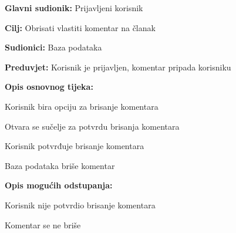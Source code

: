\noindent {}
\begin{packed_item}

\item \textbf{Glavni sudionik:} Prijavljeni korisnik
\item  \textbf{Cilj:} Obrisati vlastiti komentar na članak
\item  \textbf{Sudionici:} Baza podataka
\item  \textbf{Preduvjet:} Korisnik je prijavljen, komentar pripada korisniku
\item  \textbf{Opis osnovnog tijeka:}

\item[] \begin{packed_enum}

    \item Korisnik bira opciju za brisanje komentara
    \item Otvara se sučelje za potvrdu brisanja komentara
    \item Korisnik potvrđuje brisanje komentara
    \item Baza podataka briše komentar

\end{packed_enum}

\item  \textbf{Opis mogućih odstupanja:}

\item[] \begin{packed_item}

    \item[3.a] Korisnik nije potvrdio brisanje komentara
    \item[] \begin{packed_enum}

        \item Komentar se ne briše

    \end{packed_enum}

\end{packed_item}
\end{packed_item}

